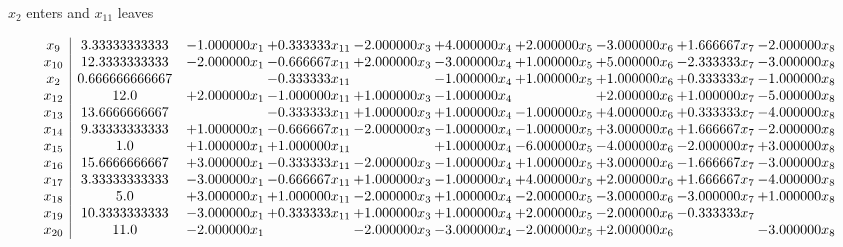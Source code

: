 \documentclass[10pt]{article}
\begin{document}
 $ x_{2} $ enters and $ x_{11} $ leaves 

 \[\begin{array}{c| c c@{\hskip 2pt} c@{\hskip 2pt} c@{\hskip 2pt} c@{\hskip 2pt} c@{\hskip 2pt} c@{\hskip 2pt} c@{\hskip 2pt} c@{\hskip 2pt} }
 x_{9}   &  3.33333333333 & -1.000000 x_{1} & + 0.333333 x_{11} & -2.000000 x_{3} & + 4.000000 x_{4} & + 2.000000 x_{5} & -3.000000 x_{6} & + 1.666667 x_{7} & -2.000000 x_{8}\\
 x_{10}   &  12.3333333333 & -2.000000 x_{1} & -0.666667 x_{11} & + 2.000000 x_{3} & -3.000000 x_{4} & + 1.000000 x_{5} & + 5.000000 x_{6} & -2.333333 x_{7} & -3.000000 x_{8}\\
 x_{2}   &  0.666666666667  &   & -0.333333 x_{11} &   & -1.000000 x_{4} & + 1.000000 x_{5} & + 1.000000 x_{6} & + 0.333333 x_{7} & -1.000000 x_{8}\\
 x_{12}   &  12.0 & + 2.000000 x_{1} & -1.000000 x_{11} & + 1.000000 x_{3} & -1.000000 x_{4} &   & + 2.000000 x_{6} & + 1.000000 x_{7} & -5.000000 x_{8}\\
 x_{13}   &  13.6666666667  &   & -0.333333 x_{11} & + 1.000000 x_{3} & + 1.000000 x_{4} & -1.000000 x_{5} & + 4.000000 x_{6} & + 0.333333 x_{7} & -4.000000 x_{8}\\
 x_{14}   &  9.33333333333 & + 1.000000 x_{1} & -0.666667 x_{11} & -2.000000 x_{3} & -1.000000 x_{4} & -1.000000 x_{5} & + 3.000000 x_{6} & + 1.666667 x_{7} & -2.000000 x_{8}\\
 x_{15}   &  1.0 & + 1.000000 x_{1} & + 1.000000 x_{11} &   & + 1.000000 x_{4} & -6.000000 x_{5} & -4.000000 x_{6} & -2.000000 x_{7} & + 3.000000 x_{8}\\
 x_{16}   &  15.6666666667 & + 3.000000 x_{1} & -0.333333 x_{11} & -2.000000 x_{3} & -1.000000 x_{4} & + 1.000000 x_{5} & + 3.000000 x_{6} & -1.666667 x_{7} & -3.000000 x_{8}\\
 x_{17}   &  3.33333333333 & -3.000000 x_{1} & -0.666667 x_{11} & + 1.000000 x_{3} & -1.000000 x_{4} & + 4.000000 x_{5} & + 2.000000 x_{6} & + 1.666667 x_{7} & -4.000000 x_{8}\\
 x_{18}   &  5.0 & + 3.000000 x_{1} & + 1.000000 x_{11} & -2.000000 x_{3} & + 1.000000 x_{4} & -2.000000 x_{5} & -3.000000 x_{6} & -3.000000 x_{7} & + 1.000000 x_{8}\\
 x_{19}   &  10.3333333333 & -3.000000 x_{1} & + 0.333333 x_{11} & + 1.000000 x_{3} & + 1.000000 x_{4} & + 2.000000 x_{5} & -2.000000 x_{6} & -0.333333 x_{7} &   \\
 x_{20}   &  11.0 & -2.000000 x_{1} &   & -2.000000 x_{3} & -3.000000 x_{4} & -2.000000 x_{5} & + 2.000000 x_{6} &   & -3.000000 x_{8}\\

\end{array}\]
\end{document}
